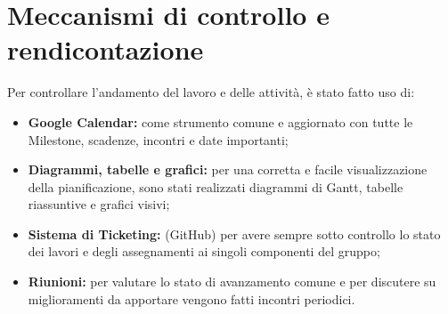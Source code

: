 \section{Meccanismi di controllo e rendicontazione}
\label{MeccanismiControlloRendicontazione}

Per controllare l'andamento del lavoro e delle attività, è stato fatto uso di:
	
\begin{itemize}		
	\item \textbf{Google Calendar\glossario{}:} come strumento comune e aggiornato con tutte le Milestone\glossario{}, scadenze, incontri e date importanti;
		
	\item \textbf{Diagrammi, tabelle e grafici:} per una corretta e facile visualizzazione della pianificazione, sono stati realizzati diagrammi di Gantt\glossario{}, tabelle riassuntive e grafici visivi;
		
	\item \textbf{Sistema di Ticketing:} (GitHub\glossario{}) per avere sempre sotto controllo lo stato dei lavori e degli assegnamenti ai singoli componenti del gruppo;
		
	\item \textbf{Riunioni:} per valutare lo stato di avanzamento comune e per discutere su miglioramenti da apportare vengono fatti incontri periodici.
		
\end{itemize}